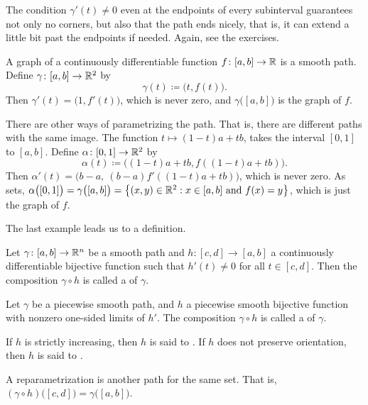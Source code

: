 The condition $\gamma'(t) \neq 0$ even at the endpoints of
every subinterval guarantees
not only no corners, but also that the path ends nicely, that is, it can
extend a little bit past the endpoints if needed.  Again, see the exercises.

\begin{example}
A graph of a continuously differentiable function $f \colon [a,b] \to {\mathbb{R}}$ is a smooth path.
Define $\gamma \colon [a,b] \to {\mathbb{R}}^2$ by
\begin{equation*}
\gamma(t) \coloneqq \bigl(t,f(t)\bigr) .
\end{equation*}
Then $\gamma'(t) = \bigl( 1 , f'(t) \bigr)$, which is never zero,
and $\gamma\bigl([a,b]\bigr)$ is the graph of $f$.

There are other ways of parametrizing the path.  That is, there are
different paths with the same image.
The function $t \mapsto (1-t)a+tb$, takes the interval $[0,1]$ to $[a,b]$.
Define
$\alpha \colon [0,1] \to {\mathbb{R}}^2$ by
\begin{equation*}
\alpha(t) \coloneqq \bigl((1-t)a+tb,f((1-t)a+tb)\bigr) .
\end{equation*}
Then
$\alpha'(t) = \bigl( b-a ,~ (b-a)f'((1-t)a+tb) \bigr)$, which is never zero.
As sets, $\alpha\bigl([0,1]\bigr) = \gamma\bigl([a,b]\bigr)
= \bigl\{ (x,y) \in {\mathbb{R}}^2 : x \in [a,b] \text{ and } f(x) = y \bigr\}$,
which is just the graph of $f$.
\end{example}

The last example leads us to a definition.

\begin{defn}
Let $\gamma \colon [a,b] \to {\mathbb{R}}^n$ be a smooth path and
$h \colon [c,d] \to [a,b]$ a continuously differentiable bijective function
such that $h'(t) \neq 0$ for all $t \in [c,d]$.  Then
the composition
$\gamma \circ h$ is called a
\emph{}
of $\gamma$.

Let $\gamma$ be a piecewise smooth path, and
$h$ a piecewise smooth bijective function with
nonzero one-sided limits of $h'$.
The composition
$\gamma \circ h$ is called a
\emph{} of $\gamma$.

If $h$ is strictly increasing, then $h$ is 
said to \emph{}.  If $h$ does not preserve
orientation, then $h$ is said to \emph{}.
\end{defn}

A reparametrization is another path for the same set.  That is,
$(\gamma \circ h)\bigl([c,d]\bigr) =
\gamma \bigl([a,b]\bigr)$.

